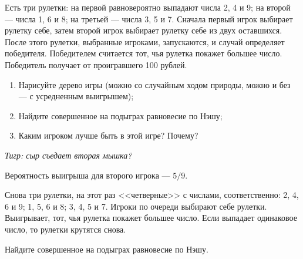 \begin{problem}[Рулетки {[О]}]\par
\begin{source} \cite{binmore:fg} \end{source}
Есть три рулетки: на первой равновероятно выпадают числа 2, 4 и 9; на второй --- числа 1, 6 и 8; на третьей --- числа 3, 5 и 7. Сначала первый игрок выбирает рулетку себе, затем второй игрок выбирает рулетку себе из двух оставшихся. После этого рулетки, выбранные игроками, запускаются, и случай определяет победителя. Победителем считается тот, чья рулетка покажет большее число. Победитель получает от проигравшего 100 рублей.\par
\begin{enumerate}
\item Нарисуйте дерево игры (можно со случайным ходом природы, можно и без --- с усредненным выигрышем);
\item Найдите совершенное на подыграх равновесие по Нэшу;
\item Каким игроком лучше быть в этой игре? Почему?
\end{enumerate}
{\it Тигр: сыр съедает вторая мышка?}



\begin{sol}
Вероятность выигрыша для второго игрока --- $5/9$.
\end{sol}
\end{problem}



\begin{problem}[Рулетки]\par
\begin{source} \cite{binmore:fg} \end{source}
Снова три рулетки, на этот раз <<четверные>> с числами, соответственно: 2, 4, 6 и 9; 1, 5, 6 и 8; 3, 4, 5 и 7. Игроки по очереди выбирают себе рулетки. Выигрывает, тот, чья рулетка покажет большее число. Если выпадает одинаковое число, то рулетки крутятся снова.\par
Найдите совершенное на подыграх равновесие по Нэшу.

\begin{sol}

\end{sol}
\end{problem}



